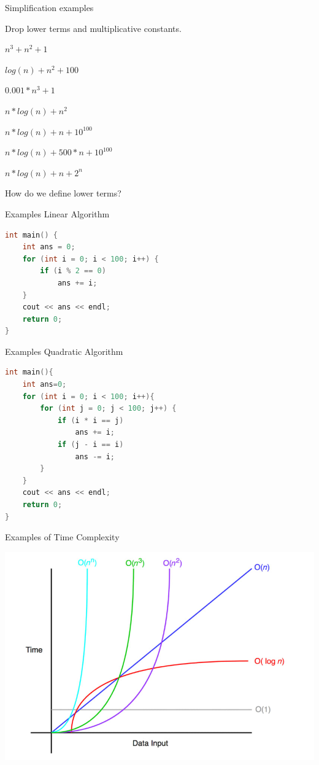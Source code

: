 \documentclass{beamer}
\begin{document}
\begin{frame}{Simplification examples}

	Drop lower terms and multiplicative constants.

	\begin{center}

	$n^3 + n^2 + 1$

	$log(n) + n^2 + 100$

	$0.001*n^3 + 1$

	$ n*log(n) + n^2$

	$ n*log(n) + n + 10^{100}$

	$ n*log(n) + 500*n + 10^{100}$

	$ n*log(n) + n + 2^n$

	\end{center}

	How do we define lower terms? 

\end{frame}

\begin{frame}[fragile]{Examples Linear Algorithm}

\begin{lstlisting}[language=C++]
int main() {
	int ans = 0;
	for (int i = 0; i < 100; i++) {
		if (i % 2 == 0)
			ans += i;
	}
	cout << ans << endl;
	return 0;
}
\end{lstlisting}

\end{frame}

\begin{frame}[fragile]{Examples Quadratic Algorithm}

\begin{lstlisting}[language=C++]
int main(){
	int ans=0;
	for (int i = 0; i < 100; i++){
		for (int j = 0; j < 100; j++) {
			if (i * i == j)
				ans += i;
			if (j - i == i)
				ans -= i;
		}
	}
	cout << ans << endl;
	return 0;
}
\end{lstlisting}

\end{frame}

\begin{frame}{Examples of Time Complexity}
	\begin{center}
		\includegraphics[width=.85\linewidth]{../img/bigOchart}
	\end{center}
\end{frame}
\end{document}
